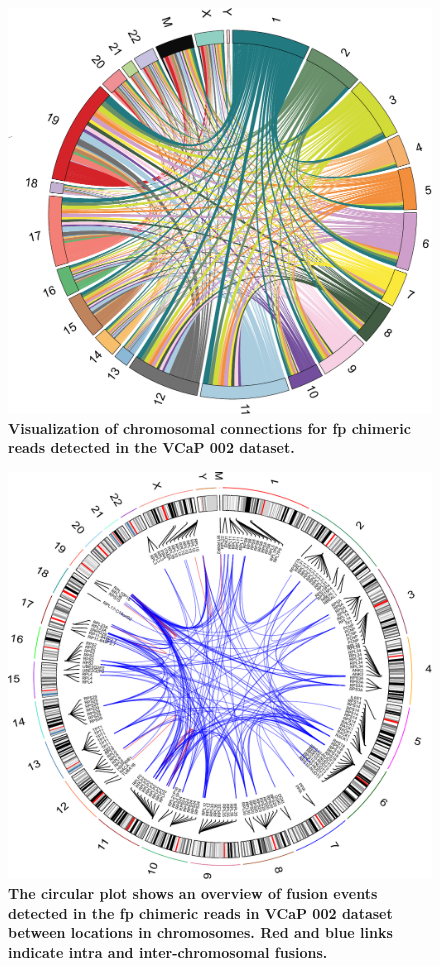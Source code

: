 \documentclass[pdflatex, sn-mathphys-num, lineno]{sn-jnl}%
\theoremstyle{thmstyleone}%
\theoremstyle{thmstyletwo}%
\theoremstyle{thmstylethree}%
\begin{document}
\begin{figure}[!h]
	\includegraphics[height=0.95\columnwidth]{finals/sf2}
	\caption{ {\bf  Visualization of chromosomal connections for \gls{fp} chimeric reads detected in the VCaP 002 dataset. }}
	\label{fig:sf2}
\end{figure}



\begin{figure}[!h]
	\includegraphics[height=0.97\columnwidth]{finals/sf3}
	\caption{ {\bf  The circular plot shows an overview of fusion events detected in the \gls{fp} chimeric reads in VCaP 002 dataset between locations in chromosomes. Red and blue links indicate intra and inter-chromosomal fusions. }}
	\label{fig:sf2}
\end{figure}
\end{document}
